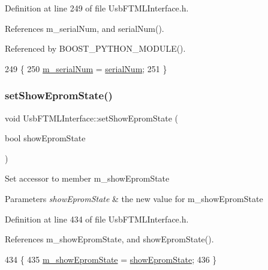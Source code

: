 Definition at line 249 of file Usb\+F\+T\+M\+L\+Interface.\+h.



References m\+\_\+serial\+Num, and serial\+Num().



Referenced by B\+O\+O\+S\+T\+\_\+\+P\+Y\+T\+H\+O\+N\+\_\+\+M\+O\+D\+U\+L\+E().


\begin{DoxyCode}
249                                           \{
250     \hyperlink{classUsbFTMLInterface_a389d847226de3203f7331ab8509c442c}{m\_serialNum} = \hyperlink{classUsbFTMLInterface_a6b005503472f0ff0357662555275cba4}{serialNum};
251   \}
\end{DoxyCode}
\mbox{\label{classUsbFTMLInterface_a051a6eb8e7fe43c9c97d61f8aafeea8e}} 
\subsubsection{\texorpdfstring{set\+Show\+Eprom\+State()}{setShowEpromState()}}
{\footnotesize\ttfamily void Usb\+F\+T\+M\+L\+Interface\+::set\+Show\+Eprom\+State (\begin{DoxyParamCaption}\item[{bool}]{show\+Eprom\+State }\end{DoxyParamCaption})\hspace{0.3cm}{\ttfamily [inline]}}

Set accessor to member m\+\_\+show\+Eprom\+State 
\begin{DoxyParams}{Parameters}
{\em show\+Eprom\+State} & the new value for m\+\_\+show\+Eprom\+State \\
\hline
\end{DoxyParams}


Definition at line 434 of file Usb\+F\+T\+M\+L\+Interface.\+h.



References m\+\_\+show\+Eprom\+State, and show\+Eprom\+State().


\begin{DoxyCode}
434                                                \{
435     \hyperlink{classUsbFTMLInterface_ac9505aba2e8a9fd9de9aed880a56a650}{m\_showEpromState} = \hyperlink{classUsbFTMLInterface_aa62fc0edc39360eeb473fe9e91df9044}{showEpromState};
436   \}
\end{DoxyCode}
\mbox{\label{classUsbFTMLInterface_a8aa032fbbaf9d0adbeea2d147d7c8a14}} 
